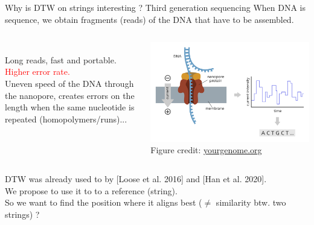 \begin{frame}{Why is DTW on strings interesting ? Third generation sequencing}
    \small
    When DNA is sequence, we obtain fragments (reads) of the DNA that have to be assembled.
    \begin{columns}
    \smallskip
    \\
    \smallskip
    \textcolor{mygreen}{Long reads, fast and portable.}\\
    \smallskip
    \textcolor{red}{Higher error rate.}\\
    \smallskip
    Uneven speed of the DNA through the nanopore, creates errors on the length when the same nucleotide is repeated (homopolymers/runs)...
    \begin{center}
    \includegraphics[scale=0.20]{figures/ont-sequencing_yourgenome.png}\\
    {\tiny Figure credit: \href{https://www.yourgenome.org/facts/what-is-oxford-nanopore-technology-ont-sequencing/}{yourgenome.org}}
    \end{center}
    
    \end{columns}
    \vfill
    { DTW  was already used to  by [Loose et al. 2016] and [Han et al. 2020].\\
    We propose to use it to  to a reference (string).\\ 
    So we want to find the position where it aligns best ($\neq$ similarity btw. two strings) ?}
    
\end{frame}

